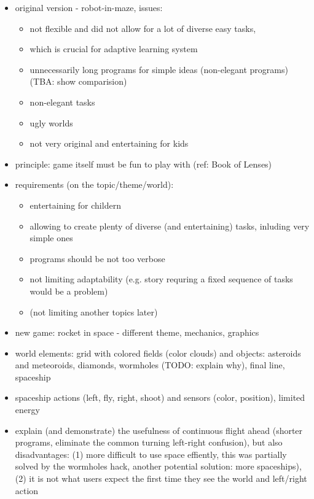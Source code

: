 \begin{itemize}
\item original version - robot-in-maze, issues:
  \begin{itemize}
  \item not flexible and did not allow for a lot of diverse easy tasks,
  \item which is crucial for adaptive learning system
  \item unnecessarily long programs for simple ideas (non-elegant programs) (TBA: show comparision)
  \item non-elegant tasks
  \item ugly worlds
  \item not very original and entertaining for kids
  \end{itemize}
\item principle: game itself must be fun to play with (ref: Book of Lenses)
\item requirements (on the topic/theme/world):
  \begin{itemize}
  \item entertaining for childern
  \item allowing to create plenty of diverse (and entertaining) tasks, inluding very simple ones
  \item programs should be not too verbose
  \item not limiting adaptability (e.g. story requring a fixed sequence of tasks would be a problem)
  \item (not limiting another topics later)
  \end{itemize}
\item new game: rocket in space - different theme, mechanics, graphics
\item world elements: grid with colored fields (color clouds) and objects: asteroids and meteoroids, diamonds, wormholes (TODO: explain why), final line, spaceship
\item spaceship actions (left, fly, right, shoot) and sensors (color, position), limited energy
\item explain (and demonstrate) the usefulness of continuous flight ahead (shorter programs, eliminate the common turning left-right confusion), but also disadvantages: (1) more difficult to use space effiently, this was partially solved by the wormholes hack, another potential solution: more spaceships), (2) it is not what users expect the first time they see the world and left/right action
\end{itemize}



